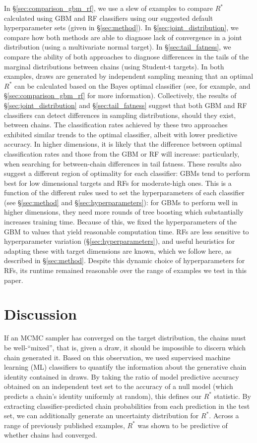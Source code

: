 \documentclass[ba]{imsart}
\numberwithin{equation}{section}
\theoremstyle{plain}
\begin{document}
In \S\ref{sec:comparison_gbm_rf}, we use a slew of examples to compare $R^*$ calculated using GBM and RF classifiers using our suggested default hyperparameter sets (given in \S\ref{sec:method}). In \S\ref{sec:joint_distribution}, we compare how both methods are able to diagnose lack of convergence in a joint distribution (using a multivariate normal target). In \S\ref{sec:tail_fatness}, we compare the ability of both approaches to diagnose differences in the tails of the marginal distributions between chains (using Student-t targets). In both examples, draws are generated by independent sampling meaning that an optimal $R^*$ can be calculated based on the Bayes optimal classifier (see, for example, \citep{devroye2013probabilistic} and \S\ref{sec:comparison_gbm_rf} for more information). Collectively, the results of \S\ref{sec:joint_distribution} and \S\ref{sec:tail_fatness} suggest that both GBM and RF classifiers can detect differences in sampling distributions, should they exist, between chains. The classification rates achieved by these two approaches exhibited similar trends to the optimal classifier, albeit with lower predictive accuracy. In higher dimensions, it is likely that the difference between optimal classification rates and those from the GBM or RF will increase: particularly, when searching for between-chain differences in tail fatness. These results also suggest a different region of optimality for each classifier: GBMs tend to perform best for low dimensional targets and RFs for moderate-high ones. This is a function of the different rules used to set the hyperparameters of each classifier (see \S\ref{sec:method} and \S\ref{sec:hyperparameters}): for GBMs to perform well in higher dimensions, they need more rounds of tree boosting which substantially increases training time. Because of this, we fixed the hyperparameters of the GBM to values that yield reasonable computation time. RFs are less sensitive to hyperparameter variation (\S\ref{sec:hyperparameters}), and useful heuristics for adapting these with target dimensions are known, which we follow here, as described in \S\ref{sec:method}. Despite this dynamic choice of hyperparameters for RFs, its runtime remained reasonable over the range of examples we test in this paper.

\section{Discussion}
If an MCMC sampler has converged on the target distribution, the chains must be well-``mixed'', that is, given a draw, it should be impossible to discern which chain generated it. Based on this observation, we used supervised machine learning (ML) classifiers to quantify the information about the generative chain identity contained in draws. By taking the ratio of model predictive accuracy obtained on an independent test set to the accuracy of a null model (which predicts a chain's identity uniformly at random), this defines our $R^*$ statistic. By extracting classifier-predicted chain probabilities from each prediction in the test set, we can additionally generate an uncertainty distribution for $R^*$. Across a range of previously published examples, $R^*$ was shown to be predictive of whether chains had converged.
\end{document}
